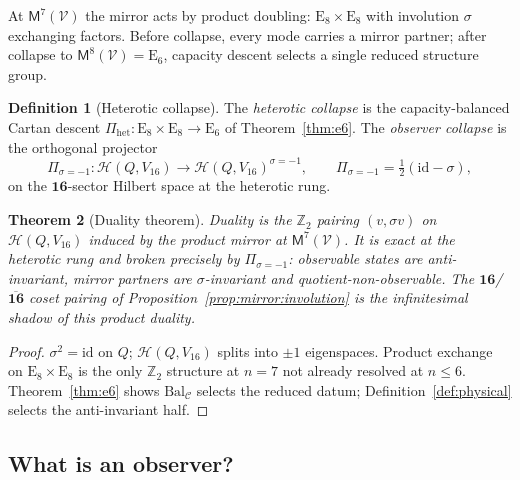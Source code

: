 \documentclass[aps,prd,onecolumn,amsmath,amssymb,nofootinbib,11pt]{revtex4-2}
\numberwithin{equation}{section}
\theoremstyle{plain}
\newtheorem{theorem}{Theorem}[section]
\theoremstyle{definition}
\newtheorem{definition}[theorem]{Definition}
\theoremstyle{remark}
\newcommand{\E}[1]{\mathrm{E}_{#1}}
\newcommand{\Void}{\mathcal{V}}
\newcommand{\Mirror}{\mathsf{M}}
\begin{document}
At $\Mirror^7(\Void)$ the mirror acts by product doubling:
$\E{8}\times\E{8}$ with involution $\sigma$ exchanging factors. Before
collapse, every mode carries a mirror partner; after collapse to
$\Mirror^8(\Void)=\E{6}$, capacity descent selects a single reduced structure
group.

\begin{definition}[Heterotic collapse]\label{def:heterotic-collapse}
The \emph{heterotic collapse} is the capacity-balanced Cartan descent
$\Pi_{\mathrm{het}}:\E{8}\times\E{8}\to\E{6}$ of Theorem~\ref{thm:e6}.
The \emph{observer collapse} is the orthogonal projector
\begin{equation}\label{eq:collapse-observer}
  \Pi_{\sigma=-1}: \mathcal{H}(Q,V_{16}) \to \mathcal{H}(Q,V_{16})^{\sigma=-1},
  \qquad
  \Pi_{\sigma=-1}=\tfrac12(\mathrm{id}-\sigma),
\end{equation}
on the $\mathbf{16}$-sector Hilbert space at the heterotic rung.
\end{definition}

\begin{theorem}[Duality theorem]\label{thm:duality}
Duality is the $\mathbb{Z}_2$ pairing $(v,\sigma v)$ on
$\mathcal{H}(Q,V_{16})$ induced by the product mirror at
$\Mirror^7(\Void)$. It is exact at the heterotic rung and broken precisely by
$\Pi_{\sigma=-1}$: observable states are anti-invariant, mirror partners are
$\sigma$-invariant and quotient-non-observable. The $\mathbf{16}$/
$\overline{\mathbf{16}}$ coset pairing of Proposition~\ref{prop:mirror:involution}
is the infinitesimal shadow of this product duality.
\end{theorem}

\begin{proof}
$\sigma^2=\mathrm{id}$ on $Q$; $\mathcal{H}(Q,V_{16})$ splits into
$\pm1$ eigenspaces. Product exchange on $\E{8}\times\E{8}$ is the only
$\mathbb{Z}_2$ structure at $n=7$ not already resolved at $n\leq6$.
Theorem~\ref{thm:e6} shows $\mathrm{Bal}_{\mathcal{C}}$ selects the reduced
datum; Definition~\ref{def:physical} selects the anti-invariant half.
\end{proof}

\subsection{What is an observer?}
\label{sec:observer:definition}
\end{document}
